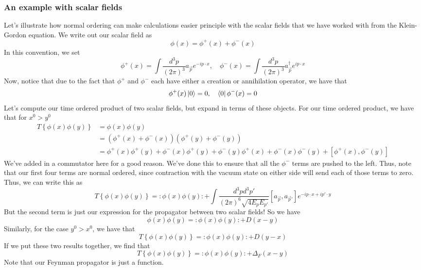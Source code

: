 \documentclass[11pt, oneside]{article}   	%
\theoremstyle{newline}
\theoremstyle{newline}
\theoremstyle{newline}
\theoremstyle{newline}
\theoremstyle{newline}
\begin{document}
\subsubsection{An example with scalar fields} 
Let's illustrate how normal ordering can 
make calculations easier principle with the scalar fields
that we have worked with from the Klein-Gordon equation. 
We write out our scalar field as 
\[
\phi ( x ) = \phi ^ + ( x ) + \phi ^ - ( x) 
\] In this convention, we set 
\[
\phi ^ + ( x) = \int \frac{ d^ 3 p }{ ( 2 \pi ) ^ 3 } a_{ \vec{p} } e^{  - i p \cdot  x }, \quad \phi ^ - ( x) = \int \frac{d^ 3 p }{ ( 2 \pi ) ^ 3 } a^\dagger_{ \vec{p} } e ^{ i p \cdot  x }
\] Now, notice that due to the fact that $ \phi ^ +$ and $ \phi ^ - $ each have either a
creation or annihilation operator, we have that 
\[
\phi ^ + ( x) \ket{ 0 } = 0 , \quad \bra{ 0 } \phi ^  -( x)  = 0 
\] Let's compute our time ordered product of two scalar fields, 
but expand in terms of these objects. 
For our time ordered product, we have that for $ x^ 0 > y ^ 0 $
\begin{align*}
T \left\{  \phi ( x) \phi ( y )  \right\}  &=  \phi ( x) \phi ( y )  \\
					   &=  ( \phi ^ + ( x) + \phi ^ - ( x ) ) ( \phi ^ + ( y ) + \phi ^ - ( y ) )  \\
					   &=  \phi ^ + ( x)  \phi ^ + ( y ) + \phi ^ - ( x) \phi ^ + ( y ) + \phi ^ - ( y ) \phi ^ + ( x) + \phi ^ - ( x) \phi ^ - ( y ) + [ \phi ^ + ( x) , \phi ^ - ( y ) ]   
\end{align*} 
We've added in a commutator here for a good reason. 
We've done this to ensure that all the $ \phi ^ - $ terms 
are pushed to the left. Thus, note that our first four terms are normal ordered, 
since contraction with the vacuum state on either 
side will send each of those terms to zero. 
Thus, we can write this as 
\[
T \left\{  \phi ( x) \phi ( y ) \right\} 	= : \phi ( x) \phi ( y ) : + \int \frac{ d^ 3 p d^ 3 p' }{ ( 2 \pi ) ^ 6 \sqrt{ 4 E_{ p } E _{ p '  } }  } [ a_{ \vec{p} } , a_{ \vec{p}' } ] e ^{  - i p \cdot  x  +i p ' \cdot  y } 
\] But the second term is just our expression for the propagator between 
two scalar fields! So we have 
\[
\phi ( x) \phi ( y ) = : \phi ( x) \phi ( y ) : +  D( x - y ) 
\] Similarly, for the case $ y ^ 0 > x ^ 0 $, 
we have that 
\[
 T \left\{  \phi ( x) \phi ( y )  \right\}  = : \phi ( x) \phi ( y ) : + D ( y - x) 
\] If we put these two results together, we find that 
\[
 T \left\{ \phi ( x) \phi ( y )  \right\}  = : \phi ( x) \phi ( y ) : + \Delta_ F( x - y )  
\] Note that our Feynman propagator is just a function.
\end{document}
